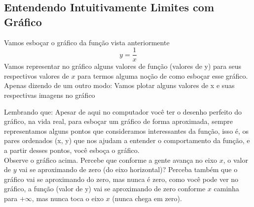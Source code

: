 \documentclass{article}
\begin{document}
\subsection{Entendendo Intuitivamente Limites com Gráfico}
Vamos esboçar o gráfico da função vista anteriormente
\[
y = \frac{1}{x}
\]
Vamos representar no gráfico alguns valores de função (valores de y) para seus respectivos valores de $x$ para termos alguma noção de como esboçar esse gráfico. Apenas dizendo de um outro modo: Vamos plotar alguns valores de x e suas respectivas imagens no gráfico
\begin{center}
\end{center}
Lembrando que: Apesar de aqui no computador você ter o desenho perfeito do gráfico, na vida real, para esboçar um gráfico de forma aproximada, sempre representamos alguns pontos que consideramos interessantes da função, isso é, os pares ordenados (x, y) que nos ajudam a entender o comportamento da função, e a partir desses pontos, você esboça o gráfico.
\\[2pt]
Observe o gráfico acima. Percebe que conforme a gente avança no eixo $x$, o valor de $y$ vai se aproximando de zero (do eixo horizontal)? Perceba também que o gráfico vai se aproximando do zero, mas nunca é zero, como você pode ver no gráfico, a função (valor de y) vai se aproximando de zero conforme $x$ caminha para $+\infty$, mas nunca toca o eixo $x$ (nunca chega em zero).
\end{document}
